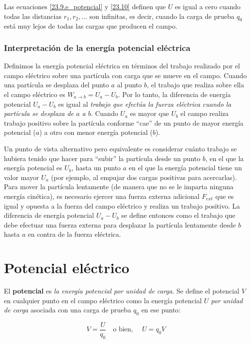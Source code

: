 Las ecuaciones \ref{23.9.e_potencial} y \ref{23.10} definen que $U$ es igual a cero cuando todas las distancias $r_1, r_2, . . .$ son infinitas, es decir, cuando la carga de prueba $q_0$ está muy lejos de todas las cargas que producen el campo.

\subsubsection{Interpretación de la energía potencial eléctrica}
Definimos la energía potencial eléctrica en términos del trabajo realizado por el campo eléctrico sobre una partícula con carga que se mueve en el campo. Cuando una partícula se desplaza del punto $a$ al punto $b$, el trabajo que realiza sobre ella el campo eléctrico es $W_{a\to b}=U_a-U_b$. Por lo tanto, la diferencia de energía potencial $U_a-U_b$ es igual al \textit{trabajo que efectúa la fuerza eléctrica cuando la partícula se desplaza de $a$ a $b$}. Cuando $U_a$ es mayor que $U_b$ el campo realiza trabajo positivo sobre la partícula conforme “cae” de un punto de mayor energía potencial ($a$) a otro con menor energía potencial ($b$).

Un punto de vista alternativo pero equivalente es considerar cuánto trabajo se hubiera tenido que hacer para “subir” la partícula desde un punto $b$, en el que la energía potencial es $U_b$, hasta un punto $a$ en el que la energía potencial tiene un valor mayor $U_a$ (por ejemplo, al empujar dos cargas positivas para acercarlas). Para mover la partícula lentamente (de manera que no se le imparta ninguna energía cinética), es necesario ejercer una fuerza externa adicional $F_{ext}$ que es igual y opuesta a la fuerza del campo eléctrico y realiza un trabajo positivo. La diferencia de energía potencial $U_a-U_b$ se define entonces como el trabajo que debe efectuar una fuerza externa para desplazar la partícula lentamente desde $b$ hasta $a$ en contra de la fuerza eléctrica.

\section{Potencial eléctrico}
El \textbf{potencial} es \textit{la energía potencial por unidad de carga}. Se define el potencial $V$ en cualquier punto en el campo eléctrico como la energía potencial $U$ \textit{por unidad de carga} asociada con una carga de prueba $q_0$ en ese punto:

\begin{equation}\label{23.12}
V=\frac{U}{q_0} \quad\text{o bien, }\quad   U=q_0V
\end{equation}

